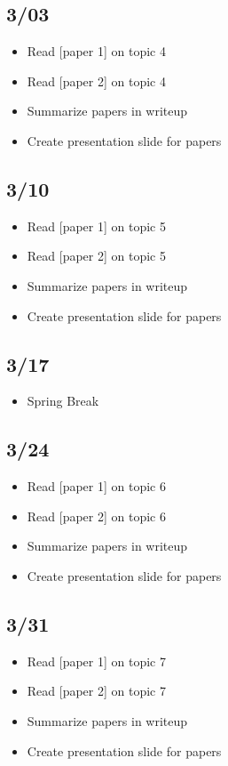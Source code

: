 \documentclass[12pt]{article}
\begin{document}
\subsection*{3/03}
\begin{itemize}
    \item Read [paper 1] on topic 4
    \item Read [paper 2] on topic 4
    \item Summarize papers in writeup
    \item Create presentation slide for papers
\end{itemize}

\subsection*{3/10}
\begin{itemize}
    \item Read [paper 1] on topic 5
    \item Read [paper 2] on topic 5
    \item Summarize papers in writeup
    \item Create presentation slide for papers
\end{itemize}

\subsection*{3/17}
\begin{itemize}
    \item Spring Break
\end{itemize}

\subsection*{3/24}
\begin{itemize}
    \item Read [paper 1] on topic 6
    \item Read [paper 2] on topic 6
    \item Summarize papers in writeup
    \item Create presentation slide for papers
\end{itemize}

\subsection*{3/31}
\begin{itemize}
    \item Read [paper 1] on topic 7
    \item Read [paper 2] on topic 7
    \item Summarize papers in writeup
    \item Create presentation slide for papers
\end{itemize}
\end{document}
